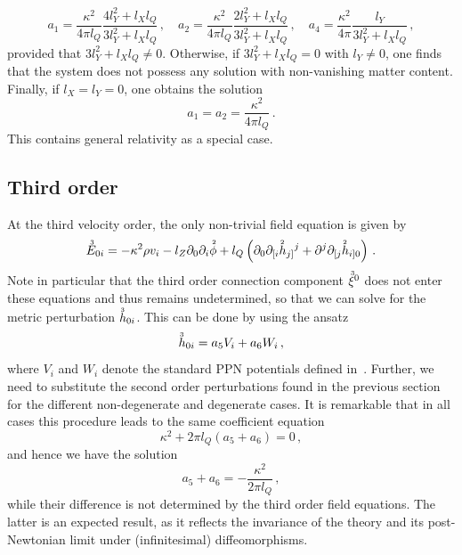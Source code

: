 \documentclass[notitlepage,a4paper,aps,prd,onecolumn,superscriptaddress,nofootinbib,groupedaddress,longbibliography]{revtex4-2}
\newcommand{\order}[2]{\accentset{#2}{#1}}
\begin{document}
\begin{equation}
a_1 = \frac{\kappa^2}{4\pi l_Q}\frac{4l_Y^2 + l_Xl_Q}{3l_Y^2 + l_Xl_Q}\,, \quad
a_2 = \frac{\kappa^2}{4\pi l_Q}\frac{2l_Y^2 + l_Xl_Q}{3l_Y^2 + l_Xl_Q}\,, \quad
a_4 = \frac{\kappa^2}{4\pi}\frac{l_Y}{3l_Y^2 + l_Xl_Q}\,,
\end{equation}
provided that \(3l_Y^2 + l_Xl_Q \neq 0\). Otherwise, if \(3l_Y^2 + l_Xl_Q = 0\) with \(l_Y \neq 0\), one finds that the system does not possess any solution with non-vanishing matter content.  Finally, if \(l_X = l_Y = 0\), one obtains the solution
\begin{equation}
a_1 = a_2 = \frac{\kappa^2}{4\pi l_Q}\,.
\end{equation}
This contains general relativity as a special case.

\subsection{Third order}\label{ssec:order3}
At the third velocity order, the only non-trivial field equation is given by
\begin{equation}
\order{E}{3}_{0i} = -\kappa^2\rho v_i - l_Z\partial_0\partial_i\order{\phi}{2} + l_Q\left(\partial_0\partial_{[i}\order{h}{2}_{j]}{}^j + \partial^j\partial_{[j}\order{h}{2}_{i]0}\right)\,.
\end{equation}
Note in particular that the third order connection component \(\order{\xi}{3}^0\) does not enter these equations and thus remains undetermined, so that we can solve for the metric perturbation \(\order{h}{3}_{0i}\). This can be done by using the ansatz
\begin{equation}
\order{h}{3}_{0i} = a_5V_i + a_6W_i\,,
\end{equation}
where \(V_i\) and \(W_i\) denote the standard PPN potentials defined in~\cite{Will:1993ns}. Further, we need to substitute the second order perturbations found in the previous section for the different non-degenerate and degenerate cases. It is remarkable that in all cases this procedure leads to the same coefficient equation
\begin{equation}
\kappa^2 + 2\pi l_Q(a_5 + a_6) = 0\,,
\end{equation}
and hence we have the solution
\begin{equation}
a_5 + a_6 = -\frac{\kappa^2}{2\pi l_Q}\,,
\end{equation}
while their difference is not determined by the third order field equations. The latter is an expected result, as it reflects the invariance of the theory and its post-Newtonian limit under (infinitesimal) diffeomorphisms.
\end{document}
